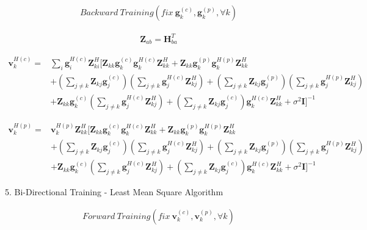 \documentclass[11pt, oneside]{article}   	%
\begin{document}
\begin{align*}
Backward\ Training (fix\  \textbf{g}^{(c)}_{k}, \textbf{g}^{(p)}_{k}, \forall k)
\end{align*}

\begin{align*}
\textbf{Z}_{ab}=\textbf{H}^{T}_{ba}
\end{align*}

\begin{align*}
\textbf{v}^{H(c)}_{k} = &\displaystyle\sum_{i}	\textbf{g}^{H(c)}_{i}	\textbf{Z}^{H}_{ki} 
[
\textbf{Z}_{kk}	\textbf{g}^{(c)}_{k}	\textbf{g}^{H(c)}_{k}	\textbf{Z}^{H}_{kk}
+\textbf{Z}_{kk}	\textbf{g}^{(p)}_{k}	\textbf{g}^{H(p)}_{k}	\textbf{Z}^{H}_{kk}	\\
&+(\displaystyle\sum_{j \neq k}\textbf{Z}_{kj}\textbf{g}^{(c)}_{j})
(\displaystyle\sum_{j \neq k}\textbf{g}^{H(c)}_{j}\textbf{Z}^{H}_{kj})
+(\displaystyle\sum_{j \neq k}\textbf{Z}_{kj}\textbf{g}^{(p)}_{j})
(\displaystyle\sum_{j \neq k}\textbf{g}^{H(p)}_{j}\textbf{Z}^{H}_{kj})	\\
&+\textbf{Z}_{kk}	\textbf{g}^{(c)}_{k}
(\displaystyle\sum_{j \neq k}\textbf{g}^{H(c)}_{j}\textbf{Z}^{H}_{kj})
+(\displaystyle\sum_{j \neq k}\textbf{Z}_{kj}\textbf{g}^{(c)}_{j})
\textbf{g}^{H(c)}_{k}	\textbf{Z}^{H}_{kk}
+\sigma^2	\textbf{I}
]^{-1}	
\end{align*}

\begin{align*}
\textbf{v}^{H(p)}_{k} = &\textbf{v}^{H(p)}_{k}	\textbf{Z}^{H}_{kk} 
[
\textbf{Z}_{kk}	\textbf{g}^{(c)}_{k}	\textbf{g}^{H(c)}_{k}	\textbf{Z}^{H}_{kk}
+\textbf{Z}_{kk}	\textbf{g}^{(p)}_{k}	\textbf{g}^{H(p)}_{k}	\textbf{Z}^{H}_{kk}	\\
&+(\displaystyle\sum_{j \neq k}\textbf{Z}_{kj}\textbf{g}^{(c)}_{j})
(\displaystyle\sum_{j \neq k}\textbf{g}^{H(c)}_{j}\textbf{Z}^{H}_{kj})
+(\displaystyle\sum_{j \neq k}\textbf{Z}_{kj}\textbf{g}^{(p)}_{j})
(\displaystyle\sum_{j \neq k}\textbf{g}^{H(p)}_{j}\textbf{Z}^{H}_{kj})	\\
&+\textbf{Z}_{kk}	\textbf{g}^{(c)}_{k}
(\displaystyle\sum_{j \neq k}\textbf{g}^{H(c)}_{j}\textbf{Z}^{H}_{kj})
+(\displaystyle\sum_{j \neq k}\textbf{Z}_{kj}\textbf{g}^{(c)}_{j})
\textbf{g}^{H(c)}_{k}	\textbf{Z}^{H}_{kk}
+\sigma^2	\textbf{I}
]^{-1}	
\end{align*}

5. Bi-Directional Training - Least Mean Square Algorithm

\begin{align*}
Forward\ Training (fix\  \textbf{v}^{(c)}_{k}, \textbf{v}^{(p)}_{k}, \forall k)
\end{align*}
\end{document}
